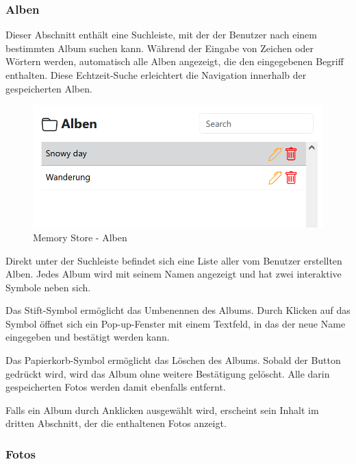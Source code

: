 \subsubsection{Alben}

Dieser Abschnitt enthält eine Suchleiste, mit der der Benutzer nach einem bestimmten Album suchen kann. Während der Eingabe von Zeichen oder Wörtern werden, automatisch alle Alben angezeigt, die den eingegebenen Begriff enthalten. Diese Echtzeit-Suche erleichtert die Navigation innerhalb der gespeicherten Alben.

\begin{figure}
    \centering
    \includegraphics[scale=0.5]{pics/memory_store_teil2.PNG}
    \caption{Memory Store - Alben}
    \label{fig:memory-store-alben}
\end{figure}

Direkt unter der Suchleiste befindet sich eine Liste aller vom Benutzer erstellten Alben. Jedes Album wird mit seinem Namen angezeigt und hat zwei interaktive Symbole neben sich.

Das Stift-Symbol ermöglicht das Umbenennen des Albums. Durch Klicken auf das Symbol öffnet sich ein Pop-up-Fenster mit einem Textfeld, in das der neue Name eingegeben und bestätigt werden kann.

Das Papierkorb-Symbol ermöglicht das Löschen des Albums. Sobald der Button gedrückt wird, wird das Album ohne weitere Bestätigung gelöscht. Alle darin gespeicherten Fotos werden damit ebenfalls entfernt.

Falls ein Album durch Anklicken ausgewählt wird, erscheint sein Inhalt im dritten Abschnitt, der die enthaltenen Fotos anzeigt.

\subsubsection{Fotos}

